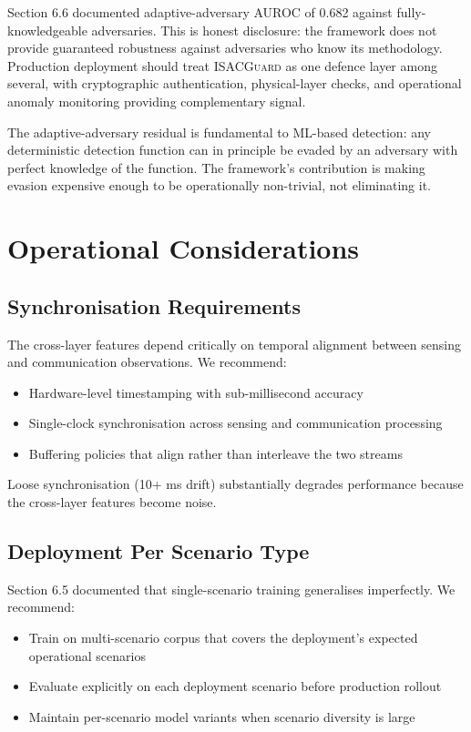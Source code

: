 \documentclass[sigconf,nonacm]{acmart}
\begin{document}
Section 6.6 documented adaptive-adversary AUROC of 0.682 against
fully-knowledgeable adversaries. This is honest disclosure: the
framework does not provide guaranteed robustness against
adversaries who know its methodology. Production deployment
should treat \textsc{ISACGuard} as one defence layer among
several, with cryptographic authentication, physical-layer
checks, and operational anomaly monitoring providing
complementary signal.

The adaptive-adversary residual is fundamental to ML-based
detection: any deterministic detection function can in principle
be evaded by an adversary with perfect knowledge of the
function. The framework's contribution is making evasion
expensive enough to be operationally non-trivial, not
eliminating it.

\section{Operational Considerations}

\subsection{Synchronisation Requirements}

The cross-layer features depend critically on temporal
alignment between sensing and communication observations. We
recommend:

\begin{itemize}
  \item Hardware-level timestamping with sub-millisecond
        accuracy
  \item Single-clock synchronisation across sensing and
        communication processing
  \item Buffering policies that align rather than interleave
        the two streams
\end{itemize}

Loose synchronisation (10+ ms drift) substantially degrades
performance because the cross-layer features become noise.

\subsection{Deployment Per Scenario Type}

Section 6.5 documented that single-scenario training generalises
imperfectly. We recommend:

\begin{itemize}
  \item Train on multi-scenario corpus that covers the
        deployment's expected operational scenarios
  \item Evaluate explicitly on each deployment scenario before
        production rollout
  \item Maintain per-scenario model variants when scenario
        diversity is large
\end{itemize}
\end{document}
